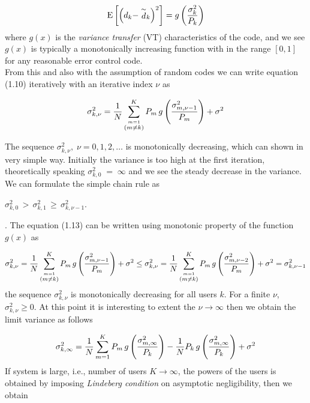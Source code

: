 \begin{equation}
\mathrm{E}\left[\left(d_k-\stackrel{\sim}{d}_k\right)^2\right]=g\left(\frac{\hbox{$\sigma_k^2$}}{\hbox{$P_k$}}\right)
\end{equation}
where $g(x)$ is the \textit{variance transfer} (VT) characteristics of the code, and we see $g(x)$ is typically a monotonically increasing function with in the range $[0,1]$ for any reasonable error control code. \\

From this and also with the assumption of random codes we can write equation (1.10) iteratively with an iterative index $\nu$ as

\begin{equation}
\sigma_{k,\nu}^2=\frac{\hbox{$1$}}{\hbox{$N$}}\sum\limits_{\stackrel{m=1}{(m\neq k)}}^{K} P_m\,g\left(\frac{\hbox{$\sigma_{m,\nu-1}^2$}}{\hbox{$P_m$}}\right)+\sigma^2
\end{equation}

The sequence $\sigma_{k,\nu}^2,\;\nu=0,1,2,\dots$ is monotonically decreasing, which can shown in very simple way. Initially the variance is too high at the first iteration, theoretically speaking $\sigma_{k,0}^2\;=\;\infty$ and we see the steady decrease in the variance. We can formulate the simple chain rule as \begin{small}$\sigma_{k,0}^2\,>\,\sigma_{k,1}^2\,\geq\,\sigma_{k,\nu-1}^2$.\end{small}. The equation (1.13) can be written using monotonic property of the function $g(x)$ as

\small
\begin{equation}
\sigma_{k,\nu}^2=\frac{\hbox{$1$}}{\hbox{$N$}}\sum\limits_{\stackrel{m=1}{(m\neq k)}}^{K} P_m\,g\left(\frac{\hbox{$\sigma_{m,\nu-1}^2$}}{\hbox{$P_m$}}\right)+\sigma^2 \leq \sigma_{k,\nu}^2=\frac{\hbox{$1$}}{\hbox{$N$}}\sum\limits_{\stackrel{m=1}{(m\neq k)}}^{K} P_m\,g\left(\frac{\hbox{$\sigma_{m,\nu-2}^2$}}{\hbox{$P_m$}}\right)+\sigma^2=\sigma_{k,\nu-1}^2
\end{equation}
\normalsize
the sequence $\sigma_{k,\nu}^2$ is monotonically decreasing for all users $k$. For a finite $\nu$, $\sigma_{k,\nu}^2\geq 0$. At this point it is interesting to extent the $\nu\rightarrow \infty$ then we obtain the limit variance as follows

\begin{equation}
\sigma_{k,\infty}^2=\frac{\hbox{$1$}}{\hbox{$N$}}\sum\limits_{m=1}^{K}P_m\,g\left(\frac{\hbox{$\sigma_{m,\infty}^2$}}{\hbox{$P_k$}}\right)-\frac{\hbox{$1$}}{\hbox{$N$}}P_k\,g\left(\frac{\hbox{$\sigma_{m,\infty}^2$}}{\hbox{$P_k$}}\right)+\sigma^2
\end{equation}
If system is large, i.e., number of users $K\rightarrow \infty$, the powers of the users is obtained by imposing \textit{Lindeberg condition} on asymptotic negligibility, then we obtain

